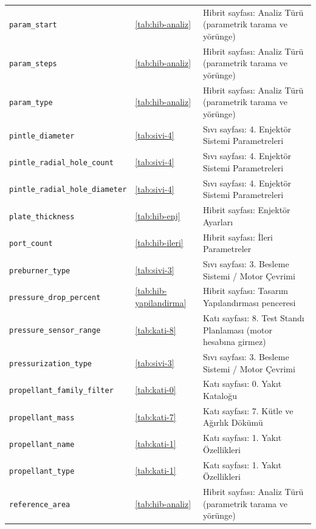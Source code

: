 \documentclass[11pt,a4paper]{article}
\begin{document}
{\begin{longtable}{@{}>{\raggedright\arraybackslash}p{5.2cm}p{1.4cm}>{\raggedright\arraybackslash}p{7.4cm}@{}}
\texttt{param\_\allowbreak{}start} & \ref{tab:hib-analiz} & Hibrit sayfası: Analiz Türü (parametrik tarama ve yörünge) \\
\texttt{param\_\allowbreak{}steps} & \ref{tab:hib-analiz} & Hibrit sayfası: Analiz Türü (parametrik tarama ve yörünge) \\
\texttt{param\_\allowbreak{}type} & \ref{tab:hib-analiz} & Hibrit sayfası: Analiz Türü (parametrik tarama ve yörünge) \\
\texttt{pintle\_\allowbreak{}diameter} & \ref{tab:sivi-4} & Sıvı sayfası: 4. Enjektör Sistemi Parametreleri \\
\texttt{pintle\_\allowbreak{}radial\_\allowbreak{}hole\_\allowbreak{}count} & \ref{tab:sivi-4} & Sıvı sayfası: 4. Enjektör Sistemi Parametreleri \\
\texttt{pintle\_\allowbreak{}radial\_\allowbreak{}hole\_\allowbreak{}diameter} & \ref{tab:sivi-4} & Sıvı sayfası: 4. Enjektör Sistemi Parametreleri \\
\texttt{plate\_\allowbreak{}thickness} & \ref{tab:hib-enj} & Hibrit sayfası: Enjektör Ayarları \\
\texttt{port\_\allowbreak{}count} & \ref{tab:hib-ileri} & Hibrit sayfası: İleri Parametreler \\
\texttt{preburner\_\allowbreak{}type} & \ref{tab:sivi-3} & Sıvı sayfası: 3. Besleme Sistemi / Motor Çevrimi \\
\texttt{pressure\_\allowbreak{}drop\_\allowbreak{}percent} & \ref{tab:hib-yapilandirma} & Hibrit sayfası: Tasarım Yapılandırması penceresi \\
\texttt{pressure\_\allowbreak{}sensor\_\allowbreak{}range} & \ref{tab:kati-8} & Katı sayfası: 8. Test Standı Planlaması (motor hesabına girmez) \\
\texttt{pressurization\_\allowbreak{}type} & \ref{tab:sivi-3} & Sıvı sayfası: 3. Besleme Sistemi / Motor Çevrimi \\
\texttt{propellant\_\allowbreak{}family\_\allowbreak{}filter} & \ref{tab:kati-0} & Katı sayfası: 0. Yakıt Kataloğu \\
\texttt{propellant\_\allowbreak{}mass} & \ref{tab:kati-7} & Katı sayfası: 7. Kütle ve Ağırlık Dökümü \\
\texttt{propellant\_\allowbreak{}name} & \ref{tab:kati-1} & Katı sayfası: 1. Yakıt Özellikleri \\
\texttt{propellant\_\allowbreak{}type} & \ref{tab:kati-1} & Katı sayfası: 1. Yakıt Özellikleri \\
\texttt{reference\_\allowbreak{}area} & \ref{tab:hib-analiz} & Hibrit sayfası: Analiz Türü (parametrik tarama ve yörünge) \\

\end{longtable}}
\end{document}
